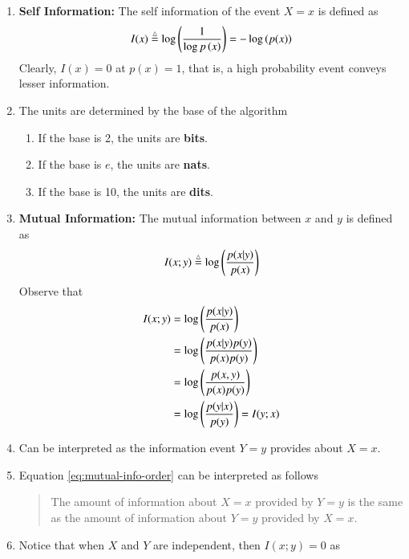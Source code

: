 \documentclass[journal,12pt,twocolumn]{IEEEtran}
\renewcommand\thesection{\arabic{section}}
\begin{document}
\begin{enumerate}[label=\thesection.\arabic*, ref=\thesection.\theenumi]
    \item \textbf{Self Information:} The self information of the event $X = x$ 
    is defined as
    \begin{align}
        I(x) \stackrel{\triangle}{=} \log\left(\frac{1}{\log{p\ensuremath{\left(x\right)}}}\right) = -\log\left(p(x)\right)
        \label{eq:self-info}
    \end{align}
    Clearly, $I(x) = 0$ at $p(x) = 1$, that is, a high probability event conveys
    lesser information.
    \item The units are determined by the base of the algorithm
    \begin{enumerate}[label=\theenumi.\arabic*, ref=\theenumi.\arabic*]
        \item If the base is 2, the units are \textbf{bits}.
        \item If the base is $e$, the units are \textbf{nats}.
        \item If the base is 10, the units are \textbf{dits}.
    \end{enumerate}
    \item \textbf{Mutual Information:} The mutual information between $x$ and $y$ 
    is defined as
    \begin{align}
        I(x;y) \stackrel{\triangle}{=} \log\left(\frac{p(x|y)}{p(x)}\right)
        \label{eq:mutual-info}
    \end{align}
    Observe that
    \begin{align}
        I(x;y) &= \log\left(\frac{p(x|y)}{p(x)}\right) \\
        &= \log\left(\frac{p(x|y)p(y)}{p(x)p(y)}\right) \\
        &= \log\left(\frac{p(x,y)}{p(x)p(y)}\right) \\
        &= \log\left(\frac{p(y|x)}{p(y)}\right) = I(y;x)
        \label{eq:mutual-info-order}
    \end{align}
    \item Can be interpreted as the information event $Y = y$ provides about
    $X = x$. 
    \item Equation \eqref{eq:mutual-info-order} can be interpreted as follows
    \begin{quote}
    The amount of information about $X = x$ provided by $Y = y$ is the same as 
    the amount of information about $Y = y$ provided by $X = x$.
    \end{quote}
    \item Notice that when $X$ and $Y$ are independent, then $I(x;y) = 0$ as 

\end{enumerate}
\end{document}
